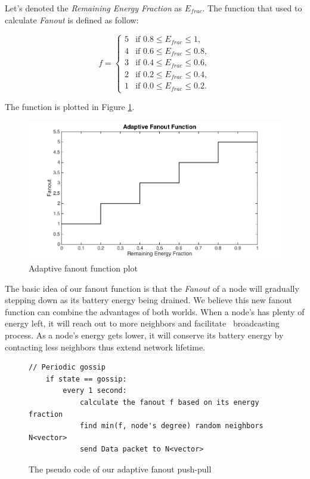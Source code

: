 Let's denoted the \emph{Remaining Energy Fraction} as $E_{frac}$. The function that used to calculate \emph{Fanout} is defined as follow:

\begin{equation*}
	f = \left\{
	\begin{array}{rl}
		5 & \text{if } 0.8 \leq E_{frac} \leq 1,\\
		4 & \text{if } 0.6 \leq E_{frac} \leq 0.8,\\
		3 & \text{if } 0.4 \leq E_{frac} \leq 0.6,\\
		2 & \text{if } 0.2 \leq E_{frac} \leq 0.4,\\					
		1 & \text{if } 0.0 \leq E_{frac} \leq 0.2.
	\end{array} \right.
\end{equation*}

The function is plotted in Figure \ref{fig:step}.

\begin{figure}[h]
	\centering
	\includegraphics[width=5.5in]{stepFunction2.png}
	\caption{Adaptive fanout function plot}
	\label{fig:step}
\end{figure}

The basic idea of our fanout function is that the \emph{Fanout} of a node will gradually stepping down as its battery energy being drained. We believe this new fanout function can combine the advantages of both worlds. When a node's has plenty of energy left, it will reach out to more neighbors and facilitate \msg ~broadcasting process. As a node's energy gets lower, it will conserve its battery energy by contacting less neighbors thus extend network lifetime.

\begin{figure}[!htbp]
	\centering
	\begin{Verbatim}[fontsize=\small]	
	// Periodic gossip	
	if state == gossip:
		every 1 second:
			calculate the fanout f based on its energy fraction
			find min(f, node's degree) random neighbors N<vector>
			send Data packet to N<vector>
	\end{Verbatim}
	\caption{The pseudo code of our adaptive fanout push-pull \gp}
	\label{fig:gossip}
\end{figure}

